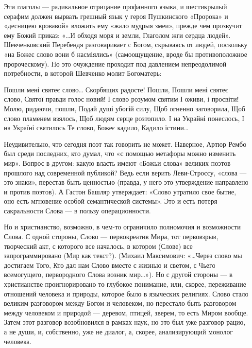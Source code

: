 Эти глаголы --- радикальное отрицание профанного языка, и шестикрылый серафим
должен вырвать грешный язык у героя Пушкинского «Пророка» и «десницею кровавой»
вложить ему «жало мудрыя змеи», прежде чем прозвучит ему Божий приказ: «…И
обходя моря и земли, Глаголом жги сердца людей». Шевченковский Перебендя
разговаривает с Богом, скрываясь от людей, поскольку «на Божеє слово вони б
насміялись» (самоощущение, вроде бы противоположное пророческому). Но это
очуждение проходит под давлением непреодолимой потребности, в которой Шевченко
молит Богоматерь:

Пошли мені святеє слово…
Скорбящих радосте! Пошли,
Пошли мені святеє слово,
Святої правди голос новий!
І слово розумом святим
І оживи, і просвіти!
Молю, ридаючи, пошли,
Подай душі убогій силу,
Щоб огненно заговорила,
Щоб слово пламенем взялось,
Щоб людям серце розтопило.
І на Украйні понеслось,
І на Україні святилось
Те слово, Божеє кадило,
Кадило істини…

Неудивительно, что сегодня поэт так говорить не может. Наверное, Артюр Рембо
был среди последних, кто думал, что «с помощью метафоры можно изменить мир».
Вопрос в другом: какую власть имеют «Божьи слова» великих поэтов прошлого над
современной публикой? Ведь если верить Леви-Строссу, «слова --- это знаки»,
перестав быть ценностью (правда, у него это утверждение направлено и против
поэтов). А Гастон Башляр утверждает: «Слово утратило свое бытие, оно есть
мгновение особой семантической системы». Это и есть потеря сакральности Слова —
в пользу операционности.

Но и христианство, возможно, в чем-то ограничило полномочия и возможности
Слова. С одной стороны, Слово --- первокреатив Мира, тот первовзрыв, творческий
акт, с которого все началось, в котором (Слове) все запрограммировано (Мир как
текст?). (Михаил Максимович: «…Через слово мы достигаем Того, Кто дал нам Слово
вместе с жизнью и светом, с Чьего всемогущего, первородного Слова возник
мир…»). Но с другой стороны --- в христианстве проигнорировано то глубокое
понимание, или, скорее, переживание отношений человека и природы, которое было
в языческих религиях. Слово стало великим разговором между Богом и человеком,
но перестало быть разговором между человеком и природой --- деревом, птицей,
зверем, то есть Миром вообще. Затем этот разговор возобновился в рамках наук,
но это был уже разговор рацио, а не души, и, собственно, уже не диалог, а,
скорее, анализирующий монолог человека.

